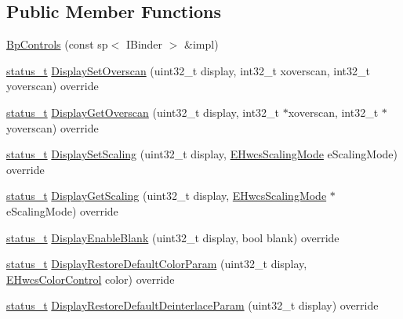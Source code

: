 \subsection*{Public Member Functions}
\begin{DoxyCompactItemize}
\item 
\mbox{\hyperlink{classhwcomposer_1_1BpControls_aa9a4edb8ba490a14b4c26740ed3e7848}{Bp\+Controls}} (const sp$<$ I\+Binder $>$ \&impl)
\item 
\mbox{\hyperlink{hwcserviceapi_8h_a3806fb2027d9a316d8ca8d9b8b8eb96f}{status\+\_\+t}} \mbox{\hyperlink{classhwcomposer_1_1BpControls_a81afe3b4e34a3563d3ab443bf491dddb}{Display\+Set\+Overscan}} (uint32\+\_\+t display, int32\+\_\+t xoverscan, int32\+\_\+t yoverscan) override
\item 
\mbox{\hyperlink{hwcserviceapi_8h_a3806fb2027d9a316d8ca8d9b8b8eb96f}{status\+\_\+t}} \mbox{\hyperlink{classhwcomposer_1_1BpControls_a3ecd92e50b486c09983d256a06b351c9}{Display\+Get\+Overscan}} (uint32\+\_\+t display, int32\+\_\+t $\ast$xoverscan, int32\+\_\+t $\ast$yoverscan) override
\item 
\mbox{\hyperlink{hwcserviceapi_8h_a3806fb2027d9a316d8ca8d9b8b8eb96f}{status\+\_\+t}} \mbox{\hyperlink{classhwcomposer_1_1BpControls_a164e8b00e9f1f58a80c587730d6d7496}{Display\+Set\+Scaling}} (uint32\+\_\+t display, \mbox{\hyperlink{hwcserviceapi_8h_acdadfd5e7f15097833789174e442083f}{E\+Hwcs\+Scaling\+Mode}} e\+Scaling\+Mode) override
\item 
\mbox{\hyperlink{hwcserviceapi_8h_a3806fb2027d9a316d8ca8d9b8b8eb96f}{status\+\_\+t}} \mbox{\hyperlink{classhwcomposer_1_1BpControls_a6778298503ceca305bf7b7a1e03a348f}{Display\+Get\+Scaling}} (uint32\+\_\+t display, \mbox{\hyperlink{hwcserviceapi_8h_acdadfd5e7f15097833789174e442083f}{E\+Hwcs\+Scaling\+Mode}} $\ast$e\+Scaling\+Mode) override
\item 
\mbox{\hyperlink{hwcserviceapi_8h_a3806fb2027d9a316d8ca8d9b8b8eb96f}{status\+\_\+t}} \mbox{\hyperlink{classhwcomposer_1_1BpControls_a7aa90940406d64dd634f21e81534725d}{Display\+Enable\+Blank}} (uint32\+\_\+t display, bool blank) override
\item 
\mbox{\hyperlink{hwcserviceapi_8h_a3806fb2027d9a316d8ca8d9b8b8eb96f}{status\+\_\+t}} \mbox{\hyperlink{classhwcomposer_1_1BpControls_a474fc42bfc7e439c79422d41d970a616}{Display\+Restore\+Default\+Color\+Param}} (uint32\+\_\+t display, \mbox{\hyperlink{hwcserviceapi_8h_a1d1cbf448ce748672cf3dd96675d70e4}{E\+Hwcs\+Color\+Control}} color) override
\item 
\mbox{\hyperlink{hwcserviceapi_8h_a3806fb2027d9a316d8ca8d9b8b8eb96f}{status\+\_\+t}} \mbox{\hyperlink{classhwcomposer_1_1BpControls_a2da4ebdc65178ec384f5f71d90b1c5fa}{Display\+Restore\+Default\+Deinterlace\+Param}} (uint32\+\_\+t display) override

\end{DoxyCompactItemize}
